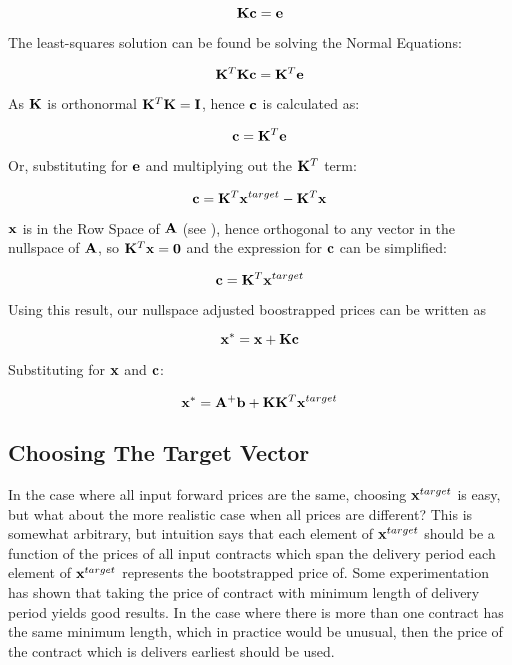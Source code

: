 \documentclass{article}
\begin{document}
\begin{equation}
    \mathbf{K}\mathbf{c} = \mathbf{e}
\end{equation}

The least-squares solution can be found be solving the Normal Equations:

\begin{equation}
    \mathbf{K}^T \mathbf{K} \mathbf{c} = \mathbf{K}^T \mathbf{e}
\end{equation}

As $\mathbf{K}$ is orthonormal $\mathbf{K}^T \mathbf{K} = \mathbf{I}$, hence $\mathbf{c}$ is calculated as:

\begin{equation}
    \mathbf{c} = \mathbf{K}^T \mathbf{e}
\end{equation}

Or, substituting for $\mathbf{e}$ and multiplying out the $\mathbf{K}^T$ term:

\begin{equation}
    \mathbf{c} = \mathbf{K}^T \mathbf{x}^{target} - \mathbf{K}^T \mathbf{x}
\end{equation}

$\mathbf{x}$ is in the Row Space of $\mathbf{A}$ (see \cite{Strang}), hence orthogonal to 
any vector in the nullspace of $\mathbf{A}$, so $\mathbf{K}^T \mathbf{x} = \mathbf{0}$ and the expression 
for $\mathbf{c}$ can be simplified:

\begin{equation}
    \mathbf{c} = \mathbf{K}^T \mathbf{x}^{target}
\end{equation}



Using this result, our nullspace adjusted boostrapped prices can be written as

\begin{equation}
    \mathbf{x}^* = \mathbf{x} + \mathbf{K}\mathbf{c}
\end{equation}

Substituting for $\mathbf{x}$ and $\mathbf{c}$:

\begin{equation}
    \mathbf{x}^* = \mathbf{A}^+ \mathbf{b} + \mathbf{K} \mathbf{K}^T \mathbf{x}^{target}
\end{equation}


\subsection{Choosing The Target Vector}
In the case where all input forward prices are the same, choosing $\mathbf{x}^{target}$ is
easy, but what about the more realistic case when all prices are different? This is
somewhat arbitrary, but intuition says that each element of $\mathbf{x}^{target}$ should be
a function of the prices of all input contracts which span the delivery period 
each element of $\mathbf{x}^{target}$ represents the bootstrapped price of. Some experimentation
has shown that taking the price of contract with minimum length of delivery period yields
good results. In the case where there is more than one contract has the same minimum length,
which in practice would be unusual, then the price of the contract which is delivers earliest 
should be used.
\end{document}
